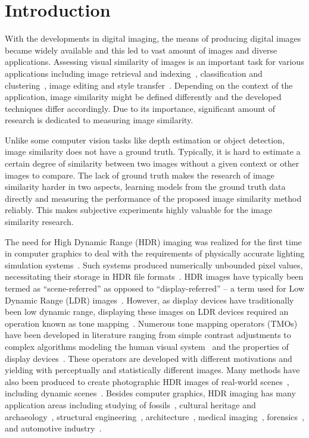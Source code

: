 \chapter{Introduction}
\label{chp:b1}
With the developments in digital imaging, the means of producing digital images became widely available and this led to vast amount of images and diverse applications. Assessing visual similarity of images is an important task for various applications including image retrieval and indexing~\cite{liu2007survey}, classification and clustering~\cite{kleiman2016toward}, image editing and style transfer~\cite{rawat2018find}. Depending on the context of the application, image similarity might be defined differently and the developed techniques differ accordingly. Due to its importance, significant amount of research is dedicated to measuring image similarity. 

Unlike some computer vision tasks like depth estimation or object detection, image similarity does not have a ground truth. Typically, it is hard to estimate a certain degree of similarity between two images without a given context or other images to compare. The lack of ground truth makes the research of image similarity harder in two aspects, learning models from the ground truth data directly and measuring the performance of the proposed image similarity method reliably. This makes subjective experiments highly valuable for the image similarity research.

The need for High Dynamic Range (HDR) imaging was realized for the first time in computer graphics to deal with the requirements of physically accurate lighting simulation systems~\cite{glassner1995principles}. Such systems produced numerically unbounded pixel values, necessitating their storage in HDR file formats~\cite{ward1998rendering}. HDR images have typically been termed as ``scene-referred'' as opposed to ``display-referred'' -- a term used for Low Dynamic Range (LDR) images~\cite{Rein2010}. However, as display devices have traditionally been low dynamic range, displaying these images on LDR devices required an operation known as tone mapping~\cite{Tumb93,Ward97}. Numerous tone mapping operators (TMOs) have been developed in literature ranging from simple contrast adjustments to complex algorithms modeling the human visual system~\cite{Ferw96} and the properties of display devices~\cite{Mantiuk2008}. These operators are developed with different motivations and yielding with perceptually and statistically different images. Many methods have also been produced to create photographic HDR images of real-world scenes~\cite{Debe97}, including dynamic scenes~\cite{sen2012robust,kalantari2017deep}. Besides computer graphics, HDR imaging has many application areas including studying of fossils~\cite{theodor2009high}, cultural heritage and archaeology~\cite{happa2010high}, structural engineering~\cite{grinzato2009seismic}, architecture~\cite{cai2013high}, medical imaging~\cite{harifi2015efficient,rizzi2018visual}, forensics~\cite{brown2010forensic}, and automotive industry~\cite{wu2012fast}.

